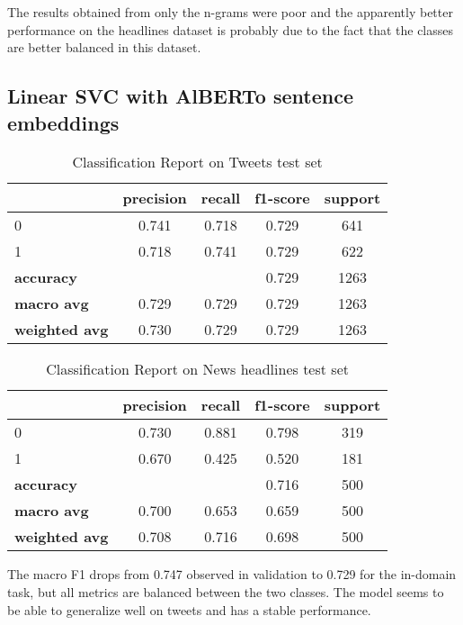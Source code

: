 \documentclass[a4paper, 9pt, twocolumn, DIV=calc]{scrartcl}
\begin{document}
The results obtained from only the n-grams were poor and the apparently better performance on the headlines dataset is probably due to the fact that the classes are better balanced in this dataset.

\subsection{Linear SVC with AlBERTo sentence embeddings}

\begin{table}[h]
    \small
    \centering
    \begin{tabular}{lcccc}
        \toprule
        & \textbf{precision} & \textbf{recall} & \textbf{f1-score} & \textbf{support} \\
        \midrule
        0 & 0.741 & 0.718 & 0.729 & 641 \\
        1 & 0.718 & 0.741 & 0.729 & 622 \\
        \midrule
        \textbf{accuracy} & & & 0.729 & 1263 \\
        \textbf{macro avg} & 0.729 & 0.729 & 0.729 & 1263 \\
        \textbf{weighted avg} & 0.730 & 0.729 & 0.729 & 1263 \\
        \bottomrule
    \end{tabular}
    \caption{Classification Report on Tweets test set}
    \label{tab:classification_report_svm_alberto_tweets}
\end{table}

\begin{table}[h]
    \small
    \centering
    \begin{tabular}{lcccc}
        \toprule
        & \textbf{precision} & \textbf{recall} & \textbf{f1-score} & \textbf{support} \\
        \midrule
        0 & 0.730 & 0.881 & 0.798 & 319 \\
        1 & 0.670 & 0.425 & 0.520 & 181 \\
        \midrule
        \textbf{accuracy} & & & 0.716 & 500 \\
        \textbf{macro avg} & 0.700 & 0.653 & 0.659 & 500 \\
        \textbf{weighted avg} & 0.708 & 0.716 & 0.698 & 500 \\
        \bottomrule
    \end{tabular}
    \caption{Classification Report on News headlines test set}
    \label{tab:classification_report_svm_alberto_news}
\end{table}
The macro F1 drops from 0.747 observed in validation to 0.729 for the in-domain task, but all metrics are balanced between the two classes. The model seems to be able to generalize well on tweets and has a stable performance.
\end{document}
